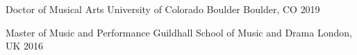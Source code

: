 

\begin{cventries}

  \cventry
    {Doctor of Musical Arts} %
    {University of Colorado Boulder} %
    {Boulder, CO} %
    {2019} %
    {
    }

  \cventry
    {Master of Music and Performance} %
    {Guildhall School of Music and Drama} %
    {London, UK} %
    {2016} %
    {
    }

\end{cventries}

